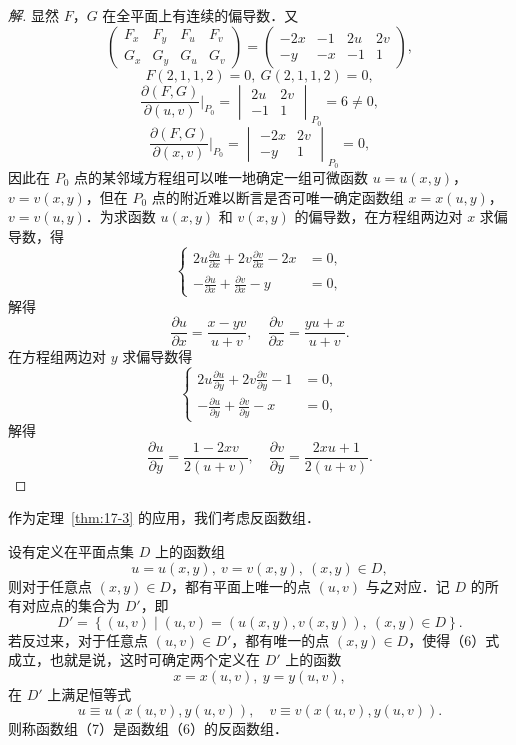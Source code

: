 \begin{proof}[解]
显然 $F$，$G$ 在全平面上有连续的偏导数．又
\[
\begin{pmatrix}F_{x}&F_{y}&F_{u}&F_{v}\\ G_{x}&G_{y}&G_{u}&G_{v}\end{pmatrix}=\begin{pmatrix}-2x&-1&2u&2v\\ -y&-x&-1&1\end{pmatrix},
\]
\[
F(2,1,1,2)=0,\ G(2,1,1,2)=0,
\]
\[
\frac{\partial(F,G)}{\partial(u,v)}\bigg|_{P_{0}}=\begin{vmatrix}2u&2v\\ -1&1\end{vmatrix}_{P_{0}}=6\neq0,
\]
\[
\frac{\partial(F,G)}{\partial(x,v)}\bigg|_{P_{0}}=\begin{vmatrix}-2x&2v\\ -y&1\end{vmatrix}_{P_{0}}=0,
\]
因此在 $P_{0}$ 点的某邻域方程组可以唯一地确定一组可微函数 $u=u(x,y)$，$v=v(x,y)$，但在 $P_{0}$ 点的附近难以断言是否可唯一确定函数组 $x=x(u,y)$，$v=v(u,y)$．为求函数 $u(x,y)$ 和 $v(x,y)$ 的偏导数，在方程组两边对 $x$ 求偏导数，得
\[
\left\{\begin{aligned}
2u\frac{\partial u}{\partial x}+2v\frac{\partial v}{\partial x}-2x&=0,\\
-\frac{\partial u}{\partial x}+\frac{\partial v}{\partial x}-y&=0,
\end{aligned}\right.
\]
解得
\[
\frac{\partial u}{\partial x}=\frac{x-yv}{u+v},\quad \frac{\partial v}{\partial x}=\frac{yu+x}{u+v}.
\]
在方程组两边对 $y$ 求偏导数得
\[
\left\{\begin{aligned}
2u\frac{\partial u}{\partial y}+2v\frac{\partial v}{\partial y}-1&=0,\\
-\frac{\partial u}{\partial y}+\frac{\partial v}{\partial y}-x&=0,
\end{aligned}\right.
\]
解得
\[
\frac{\partial u}{\partial y}=\frac{1-2xv}{2(u+v)},\quad \frac{\partial v}{\partial y}=\frac{2xu+1}{2(u+v)}.
\]
\end{proof}

作为定理~\ref{thm:17-3} 的应用，我们考虑反函数组．

设有定义在平面点集 $D$ 上的函数组
\begin{equation}
u=u(x,y),\ v=v(x,y),\ (x,y)\in D,
\tag{6}
\end{equation}
则对于任意点 $(x,y)\in D$，都有平面上唯一的点 $(u,v)$ 与之对应．记 $D$ 的所有对应点的集合为 $D'$，即
\[
D'=\left\{(u,v)\mid(u,v)=(u(x,y),v(x,y)),\ (x,y)\in D\right\}.
\]
若反过来，对于任意点 $(u,v)\in D'$，都有唯一的点 $(x,y)\in D$，使得（6）式成立，也就是说，这时可确定两个定义在 $D'$ 上的函数
\begin{equation}
x=x(u,v),\ y=y(u,v),
\tag{7}
\end{equation}
在 $D'$ 上满足恒等式
\[
u\equiv u(x(u,v),y(u,v)),\quad v\equiv v(x(u,v),y(u,v)).
\]
则称函数组（7）是函数组（6）的反函数组．


